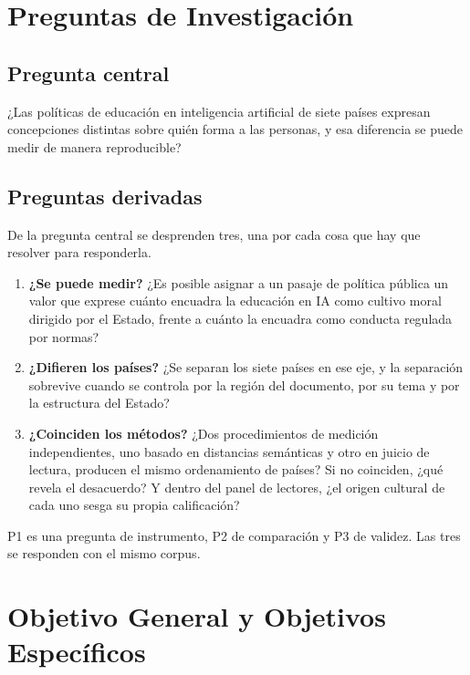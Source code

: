 \section{Preguntas de Investigación}
\label{sec:preguntas}

\subsection{Pregunta central}
\label{subsec:pregunta-central}

¿Las políticas de educación en inteligencia artificial de siete países expresan concepciones distintas sobre quién forma a las personas, y esa diferencia se puede medir de manera reproducible?

\subsection{Preguntas derivadas}
\label{subsec:preguntas-derivadas}

De la pregunta central se desprenden tres, una por cada cosa que hay que resolver para responderla.

\begin{enumerate}
  \item[\textbf{P1.}] \textbf{¿Se puede medir?} ¿Es posible asignar a un pasaje de política pública un valor que exprese cuánto encuadra la educación en IA como cultivo moral dirigido por el Estado, frente a cuánto la encuadra como conducta regulada por normas?

  \item[\textbf{P2.}] \textbf{¿Difieren los países?} ¿Se separan los siete países en ese eje, y la separación sobrevive cuando se controla por la región del documento, por su tema y por la estructura del Estado?

  \item[\textbf{P3.}] \textbf{¿Coinciden los métodos?} ¿Dos procedimientos de medición independientes, uno basado en distancias semánticas y otro en juicio de lectura, producen el mismo ordenamiento de países? Si no coinciden, ¿qué revela el desacuerdo? Y dentro del panel de lectores, ¿el origen cultural de cada uno sesga su propia calificación?
\end{enumerate}

P1 es una pregunta de instrumento, P2 de comparación y P3 de validez. Las tres se responden con el mismo corpus.


\section{Objetivo General y Objetivos Específicos}
\label{sec:objetivos}

